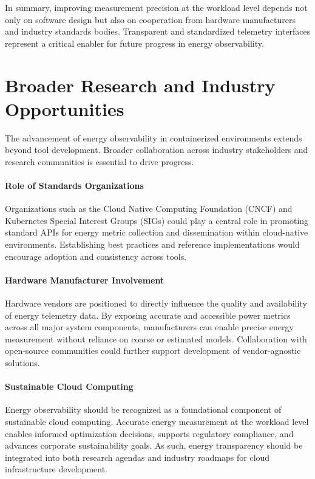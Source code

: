 In summary, improving measurement precision at the workload level depends not only on software design but also on cooperation from hardware manufacturers and industry standards bodies. Transparent and standardized telemetry interfaces represent a critical enabler for future progress in energy observability.

\section{Broader Research and Industry Opportunities}
\label{sec:future-research-industry}

The advancement of energy observability in containerized environments extends beyond tool development. Broader collaboration across industry stakeholders and research communities is essential to drive progress.

\paragraph{Role of Standards Organizations}
Organizations such as the Cloud Native Computing Foundation (CNCF) and Kubernetes Special Interest Groups (SIGs) could play a central role in promoting standard APIs for energy metric collection and dissemination within cloud-native environments. Establishing best practices and reference implementations would encourage adoption and consistency across tools.

\paragraph{Hardware Manufacturer Involvement}
Hardware vendors are positioned to directly influence the quality and availability of energy telemetry data. By exposing accurate and accessible power metrics across all major system components, manufacturers can enable precise energy measurement without reliance on coarse or estimated models. Collaboration with open-source communities could further support development of vendor-agnostic solutions.

\paragraph{Sustainable Cloud Computing}
Energy observability should be recognized as a foundational component of sustainable cloud computing. Accurate energy measurement at the workload level enables informed optimization decisions, supports regulatory compliance, and advances corporate sustainability goals. As such, energy transparency should be integrated into both research agendas and industry roadmaps for cloud infrastructure development.

